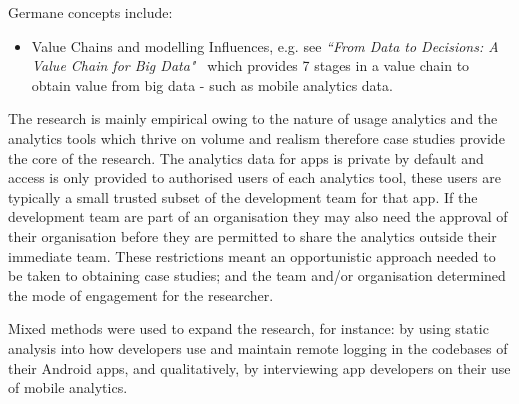 Germane concepts include:
\begin{itemize}
    \item Value Chains and modelling Influences, e.g. see \emph{``From Data to Decisions: A Value Chain for Big Data"}~\citep{miller2013_from_data_to_decisions_a_value_chain_for_big_data} which provides 7 stages in a value chain to obtain value from big data - such as mobile analytics data.
\end{itemize}


The research is mainly empirical owing to the nature of usage analytics and the analytics tools which thrive on volume and realism therefore case studies provide the core of the research. The analytics data for apps is private by default and access is only provided to authorised users of each analytics tool, these users are typically a small trusted subset of the development team for that app. If the development team are part of an organisation they may also need the approval of their organisation before they are permitted to share the analytics outside their immediate team. These restrictions meant an opportunistic approach needed to be taken to obtaining case studies; and the team and/or organisation determined the mode of engagement for the researcher.

Mixed methods were used to expand the research, for instance: by using static analysis into how developers use and maintain remote logging in the codebases of their Android apps, and qualitatively, by interviewing app developers on their use of mobile analytics. 



